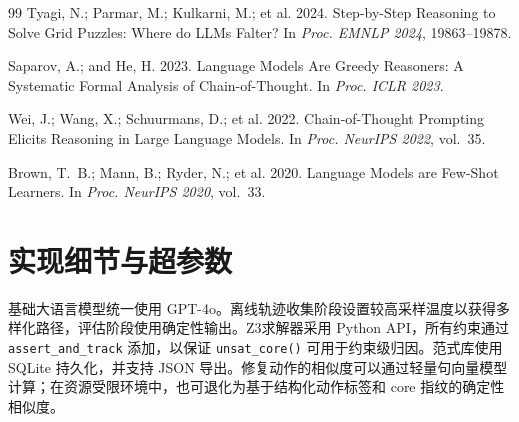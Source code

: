 \documentclass[UTF8,a4paper,12pt]{ctexart}
\newcommand{\zthree}{Z3}
\begin{document}
\begin{thebibliography}{99}
Tyagi, N.; Parmar, M.; Kulkarni, M.; et al. 2024.
Step-by-Step Reasoning to Solve Grid Puzzles: Where do LLMs Falter?
In \textit{Proc. EMNLP 2024}, 19863--19878.

Saparov, A.; and He, H. 2023.
Language Models Are Greedy Reasoners: A Systematic Formal Analysis of Chain-of-Thought.
In \textit{Proc. ICLR 2023}.

Wei, J.; Wang, X.; Schuurmans, D.; et al. 2022.
Chain-of-Thought Prompting Elicits Reasoning in Large Language Models.
In \textit{Proc. NeurIPS 2022}, vol.~35.

Brown, T.~B.; Mann, B.; Ryder, N.; et al. 2020.
Language Models are Few-Shot Learners.
In \textit{Proc. NeurIPS 2020}, vol.~33.

\end{thebibliography}

\appendix

\section{实现细节与超参数}

基础大语言模型统一使用 GPT-4o。离线轨迹收集阶段设置较高采样温度以获得多样化路径，评估阶段使用确定性输出。\zthree 求解器采用 Python API，所有约束通过 \texttt{assert\_and\_track} 添加，以保证 \texttt{unsat\_core()} 可用于约束级归因。范式库使用 SQLite 持久化，并支持 JSON 导出。修复动作的相似度可以通过轻量句向量模型计算；在资源受限环境中，也可退化为基于结构化动作标签和 core 指纹的确定性相似度。

\begin{table}[h]
  \centering
  \caption{主要超参数设置。}
  \label{tab:hyperparams}
\end{table}
\end{document}
